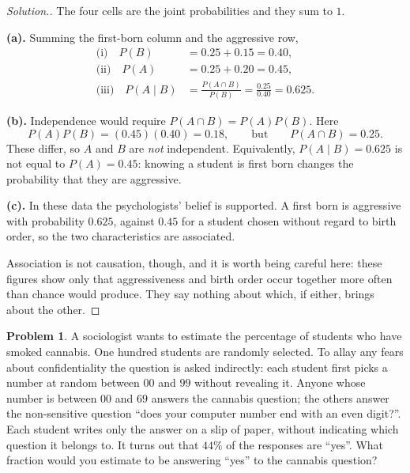 \documentclass[12pt,a4paper]{report}
\theoremstyle{definition}
\theoremstyle{plain}
\theoremstyle{definition}
\newtheorem{problemx}{Problem}[section]
\newenvironment{problem}{\begin{problemx}}{\end{problemx}}
\newenvironment{solution}
  {\renewcommand{\qedsymbol}{}\begin{proof}[\textit{Solution}.]}
  {\end{proof}}
\begin{document}
\begin{solution}
The four cells are the joint probabilities and they sum to $1$.

\textbf{(a).} Summing the first-born column and the aggressive row,
\begin{align*}
\text{(i)}\quad P(B) &= 0.25+0.15 = 0.40,\\
\text{(ii)}\quad P(A) &= 0.25+0.20 = 0.45,\\
\text{(iii)}\quad P(A\mid B) &= \frac{P(A\cap B)}{P(B)} = \frac{0.25}{0.40} = 0.625.
\end{align*}

\textbf{(b).} Independence would require $P(A\cap B) = P(A)P(B)$. Here
\[P(A)P(B) = (0.45)(0.40) = 0.18, \qquad\text{but}\qquad P(A\cap B) = 0.25.\]
These differ, so $A$ and $B$ are \emph{not} independent. Equivalently, $P(A\mid B)=0.625$ is
not equal to $P(A)=0.45$: knowing a student is first born changes the probability that
they are aggressive.

\textbf{(c).} In these data the psychologists' belief is supported. A first born is
aggressive with probability $0.625$, against $0.45$ for a student chosen without regard to
birth order, so the two characteristics are associated.

Association is not causation, though, and it is worth being careful here: these figures
show only that aggressiveness and birth order occur together more often than chance would
produce. They say nothing about which, if either, brings about the other.
\end{solution}

\begin{problem}
A sociologist wants to estimate the percentage of students who have smoked cannabis. One
hundred students are randomly selected. To allay any fears about confidentiality the
question is asked indirectly: each student first picks a number at random between $00$ and
$99$ without revealing it. Anyone whose number is between $00$ and $69$ answers the
cannabis question; the others answer the non-sensitive question ``does your computer
number end with an even digit?''. Each student writes only the answer on a slip of paper,
without indicating which question it belongs to. It turns out that $44\%$ of the responses
are ``yes''. What fraction would you estimate to be answering ``yes'' to the cannabis
question?
\end{problem}
\end{document}
